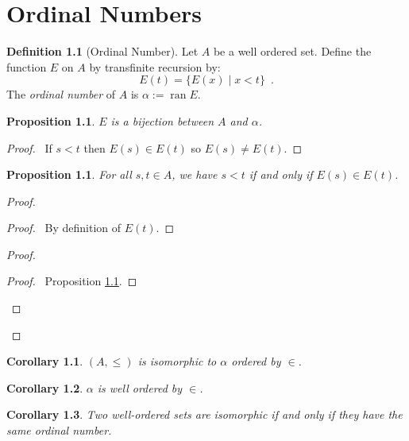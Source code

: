 \documentclass{book}
\let\qed\relax
\newtheorem{prop}[ax]{Proposition}
\newtheorem{cor}{Corollary}[ax]
\theoremstyle{definition}
\newtheorem{df}[ax]{Definition}
\newcommand{\ran}{\ensuremath{\operatorname{ran}}}
\begin{document}
\chapter{Ordinal Numbers}

\begin{df}[Ordinal Number]
Let $A$ be a well ordered set. Define the function $E$ on $A$ by transfinite recursion by:
\[ E(t) = \{ E(x) \mid x < t \} \enspace . \]
The \emph{ordinal number} of $A$ is $\alpha := \ran E$.
\end{df}

\begin{prop}
\label{prop:Ebij}
$E$ is a bijection between $A$ and $\alpha$.
\end{prop}

\begin{proof}
\pf\ If $s < t$ then $E(s) \in E(t)$ so $E(s) \neq E(t)$. \qed
\end{proof}

\begin{prop}
For all $s,t \in A$, we have $s < t$ if and only if $E(s) \in E(t)$.
\end{prop}

\begin{proof}
\pf
{}
\begin{proof}
	\pf\ By definition of $E(t)$.
\end{proof}
\begin{proof}
	\begin{proof}
		\pf\ Proposition \ref{prop:Ebij}.
	\end{proof}
\end{proof}
\qed
\end{proof}

\begin{cor}
\label{cor:wosetiso}
$(A, \leq)$ is isomorphic to $\alpha$ ordered by $\in$.
\end{cor}

\begin{cor}
\label{cor:ordwo}
$\alpha$ is well ordered by $\in$.
\end{cor}

\begin{cor}
Two well-ordered sets are isomorphic if and only if they have the same ordinal number.
\end{cor}
\end{document}
